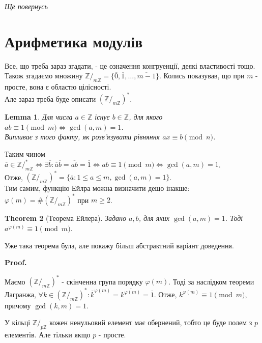 \documentclass[a4paper, 14pt]{extarticle}
\makeatletter
\theoremstyle{theoremdd}
\newtheorem{theorem}{Theorem}[subsection]
\theoremstyle{theoremdd}
\theoremstyle{theoremdd}
\theoremstyle{theoremdd}
\theoremstyle{theoremdd}
\theoremstyle{theoremdd}
\theoremstyle{theoremdd}
\newtheorem{lemma}[theorem]{Lemma}
\theoremstyle{theoremdd}
\def\qed{$\blacksquare$}
\renewenvironment{proof}[1][Proof.\\]{\par
\pushQED{\hfill \qed}%
\normalfont \topsep6\p@\@plus6\p@\relax
\trivlist
\item\relax
{\bfseries
#1\@addpunct{.}}\hspace\labelsep\ignorespaces
}{%
\popQED\endtrivlist\@endpefalse
}
\makeatother
\begin{document}
\textit{Ще повернусь}
\newpage

\section{Арифметика модулів}
Все, що треба зараз згадати, - це означення конгруенції, деякі властивості тощо.\\
Також згадаємо множину $\mathbb{Z}/_{m \mathbb{Z}} = \{  \overline{0}, \overline{1}, \dots, \overline{m-1} \}$. Колись показував, що при $m$ - просте, вона є областю цілісності.\\
Але зараз треба буде описати $(\mathbb{Z}/_{m \mathbb{Z}})^*$.

\begin{lemma}
Для числа $a \in \mathbb{Z}$ існує $b \in \mathbb{Z}$, для якого $ab \equiv 1 \pmod m \iff \gcd(a,m) = 1$.\\
\textit{Випливає з того факту, як розв'язувати рівняння $ax \equiv b \pmod n$.}
\end{lemma}

Таким чином $\overline{a} \in \mathbb{Z}/_{m \mathbb{Z}}^* \iff \exists \overline{b}: \overline{a} \overline{b} = \overline{ab} = \overline{1} \iff ab \equiv 1 \pmod m \iff \gcd(a,m)=1$.\\
Отже, $(\mathbb{Z}/_{m\mathbb{Z}})^* = \{ \overline{a}: 1 \leq a \leq m, \gcd (a,m) = 1 \}$.
\bigskip \\
Тим самим, функцію Ейлра можна визначити дещо інакше:\\
$\varphi(m) = \#(\mathbb{Z}/_{m\mathbb{Z}})^*$ при $m \geq 2$.

\begin{theorem}[Теорема Ейлера]
Задано $a,b$, для яких $\gcd(a,m)=1$. Тоді $a^{\varphi(m)} \equiv 1 \pmod m$.
\end{theorem}
Уже така теорема була, але покажу більш абстрактний варіант доведення.

\begin{proof}
Маємо $(\mathbb{Z}/_{m \mathbb{Z}})^*$ - скінченна група порядку $\varphi(m)$. Тоді за наслідком теореми Лагранжа, $\forall k \in (\mathbb{Z}/_{m \mathbb{Z}})^*: \overline{k}^{\varphi(m)} = \overline{k^{\varphi(m)}} = \overline{1}$. Отже, $k^{\varphi(m)} \equiv 1 \pmod m$, причому $\gcd(k,m)=1$.
\end{proof}

У кільці $\mathbb{Z}/_{p \mathbb{Z}}$ кожен ненульовий елемент має обернений, тобто це буде полем з $p$ елементів. Але тільки якщо $p$ - просте.
\end{document}
